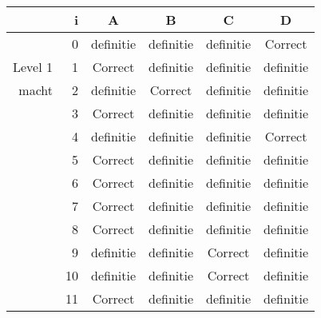 \begin{tabular}{ rr| c|c|c|c}\hline\hline
     & i & \textbf{A} & \textbf{B} & \textbf{C} & \textbf{D}\\\hline

&0&definitie&definitie&definitie&Correct\cellcolor[gray]{0.6}\\
Level 1 & 1&Correct\cellcolor[gray]{0.6}&definitie&definitie&definitie\\
macht &2&definitie&Correct\cellcolor[gray]{0.6}&definitie&definitie\\
&3&Correct\cellcolor[gray]{0.6}&definitie&definitie&definitie\\
&4&definitie&definitie&definitie&Correct\cellcolor[gray]{0.6}\\
&5&Correct\cellcolor[gray]{0.6}&definitie&definitie&definitie\\
&6&Correct\cellcolor[gray]{0.6}&definitie&definitie&definitie\\
&7&Correct\cellcolor[gray]{0.6}&definitie&definitie&definitie\\
&8&Correct\cellcolor[gray]{0.6}&definitie&definitie&definitie\\
&9&definitie&definitie&Correct\cellcolor[gray]{0.6}&definitie\\
&10&definitie&definitie&Correct\cellcolor[gray]{0.6}&definitie\\
&11&Correct\cellcolor[gray]{0.6}&definitie&definitie&definitie\\
\hline\end{tabular}\par\ \newline

